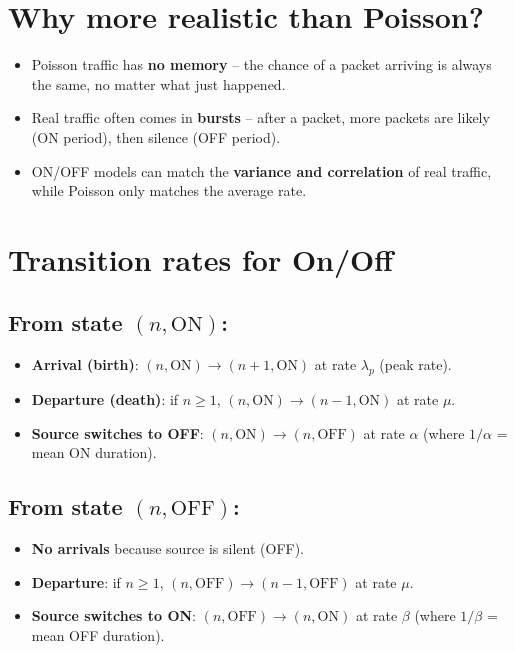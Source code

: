 \section*{Why more realistic than Poisson?}

\begin{itemize}
    \item Poisson traffic has \textbf{no memory} – the chance of a packet arriving is always the same, no matter what just happened.
    \item Real traffic often comes in \textbf{bursts} – after a packet, more packets are likely (ON period), then silence (OFF period).
    \item ON/OFF models can match the \textbf{variance and correlation} of real traffic, while Poisson only matches the average rate.
\end{itemize}

\section*{Transition rates for On/Off}

\subsection*{From state \((n, \text{ON})\):}
\begin{itemize}
    \item \textbf{Arrival (birth)}: \((n, \text{ON}) \to (n+1, \text{ON})\) at rate \(\lambda_p\) (peak rate).
    \item \textbf{Departure (death)}: if \(n \ge 1\), \((n, \text{ON}) \to (n-1, \text{ON})\) at rate \(\mu\).
    \item \textbf{Source switches to OFF}: \((n, \text{ON}) \to (n, \text{OFF})\) at rate \(\alpha\) (where \(1/\alpha\) = mean ON duration).
\end{itemize}

\subsection*{From state \((n, \text{OFF})\):}
\begin{itemize}
    \item \textbf{No arrivals} because source is silent (OFF).
    \item \textbf{Departure}: if \(n \ge 1\), \((n, \text{OFF}) \to (n-1, \text{OFF})\) at rate \(\mu\).
    \item \textbf{Source switches to ON}: \((n, \text{OFF}) \to (n, \text{ON})\) at rate \(\beta\) (where \(1/\beta\) = mean OFF duration).
\end{itemize}

